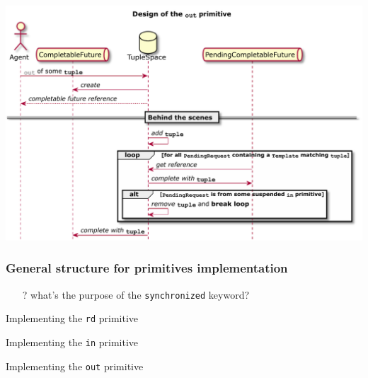 \documentclass[presentation]{beamer}\mode<presentation>{\usetheme{AMSCesenaPurpleAndGold}}
\begin{document}
\begin{frame}

\begin{center}
	\includegraphics[width=\linewidth]{./img/out-design.pdf}
\end{center}

\end{frame}

\begin{frame}
\frametitle{General structure for primitives implementation}



\begin{itemize}
	\item[?] what's the purpose of the \texttt{\alert{synchronized}} keyword?
\end{itemize}

\end{frame}

\begin{frame}[allowframebreaks]{Implementing the \texttt{rd} primitive}
	
\end{frame}

\begin{frame}[allowframebreaks]{Implementing the \texttt{in} primitive}

\end{frame}

\begin{frame}[allowframebreaks]{Implementing the \texttt{out} primitive}

\end{frame}
\end{document}

